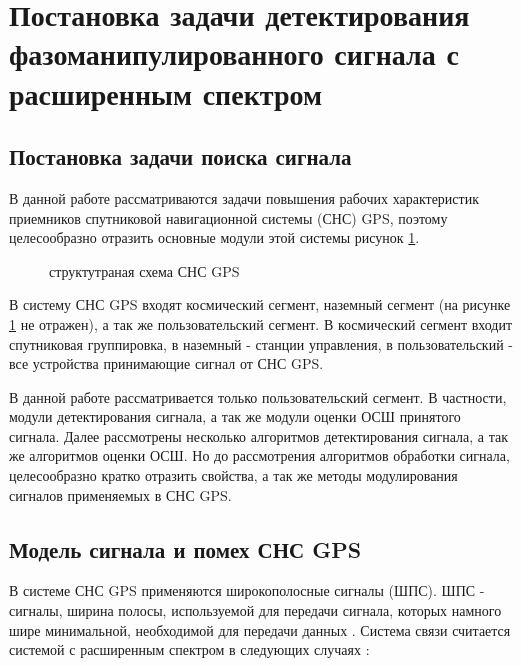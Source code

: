 \section{Постановка задачи детектирования фазоманипулированного сигнала с расширенным спектром}
\label{sec1_acq_algo}

\subsection{Постановка задачи поиска сигнала}
В данной работе рассматриваются задачи повышения рабочих характеристик приемников спутниковой навигационной системы
(СНС) GPS, поэтому целесообразно
отразить основные модули этой системы рисунок \ref{pic:sec1_gnss_system}.
\begin{figure}[H]
\center{}
\caption{структутраная схема СНС GPS}
\label{pic:sec1_gnss_system}
\end{figure}

В систему СНС GPS входят космический сегмент, наземный сегмент (на рисунке \ref{pic:sec1_gnss_system} не
отражен), а так же пользовательский сегмент. В космический сегмент входит спутниковая группировка, в 
наземный - станции управления, в пользовательский - все устройства принимающие сигнал от СНС GPS.

В данной работе рассматривается только пользовательский сегмент. В частности, модули детектирования сигнала,
а так же модули оценки ОСШ принятого сигнала. Далее рассмотрены несколько алгоритмов детектирования сигнала,
а так же алгоритмов оценки ОСШ. Но до рассмотрения алгоритмов обработки сигнала, целесообразно кратко 
отразить свойства, а так же методы модулирования сигналов применяемых в СНС GPS.

\subsection{Модель сигнала и помех СНС GPS}
В системе СНС GPS применяются широкополосные сигналы (ШПС).
ШПС - сигналы, ширина полосы, используемой для передачи сигнала, которых
намного шире минимальной, необходимой для передачи данных \cite{sklyar}. Система связи считается системой с расширенным
спектром в следующих случаях \cite{sklyar}:

